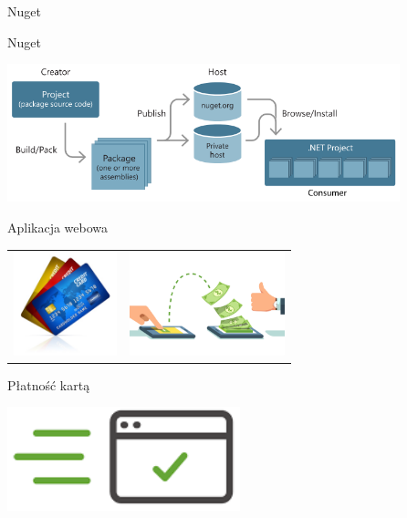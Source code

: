 \documentclass{beamer}
\begin{document}
\begin{frame}{}
	\begin{center}
		\Huge{Nuget}
	\end{center}
\end{frame}

\begin{frame}{Nuget}
	\begin{center}
  		\includegraphics[height=4cm]{nuget1.png}
	\end{center}
\end{frame}

\begin{frame}{Aplikacja webowa}
	\begin{center}
		\begin{tabular}{ m{5cm} m{5cm} }
  			\includegraphics[height=3cm]{card3.jpg} & \includegraphics[height=3cm]{przelew1.jpg}
		\end{tabular}
	\end{center}
\end{frame}

\begin{frame}{Płatność kartą}
	\begin{center}
  		\includegraphics[height=3cm]{request4.png}
	\end{center}
\end{frame}
\end{document}
